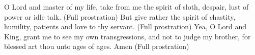 
O Lord and master of my life, take from me the spirit of sloth, despair, lust of power or idle talk. (Full prostration) But give rather the spirit of chastity, humility, patients and love to thy servant. (Full prostration) Yea, O Lord and King, grant me to see my own transgressions, and not to judge my brother, for blessed art thou unto ages of ages. Amen (Full prostration)